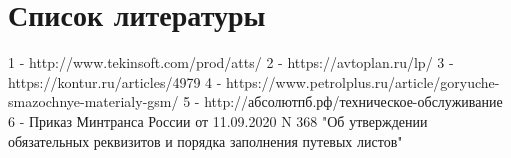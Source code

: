 \documentclass[./nirs.tex]{subfiles}
\begin{document}
\section*{Список литературы}
	1 - http://www.tekinsoft.com/prod/atts/
	2 - https://avtoplan.ru/lp/
	3 - https://kontur.ru/articles/4979
	4 - https://www.petrolplus.ru/article/goryuche-smazochnye-materialy-gsm/
	5 - http://абсолютпб.рф/техническое-обслуживание
	6 - Приказ Минтранса России от 11.09.2020 N 368 "Об утверждении обязательных
	реквизитов и порядка заполнения путевых листов"
\end{document}
